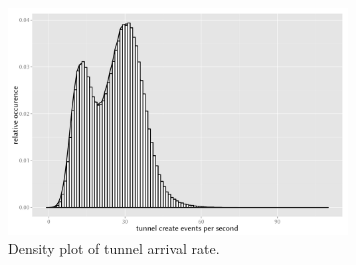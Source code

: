 \documentclass{beamer}
\begin{document}
\begin{frame}
	\begin{figure}
		\centering
			\includegraphics[height=6cm]{../../chapters/041-mobilenetsmeasuring/images/R-create-frequency.pdf}
		\caption{Density plot of tunnel arrival rate.}
	\end{figure}
\end{frame}
\end{document}
